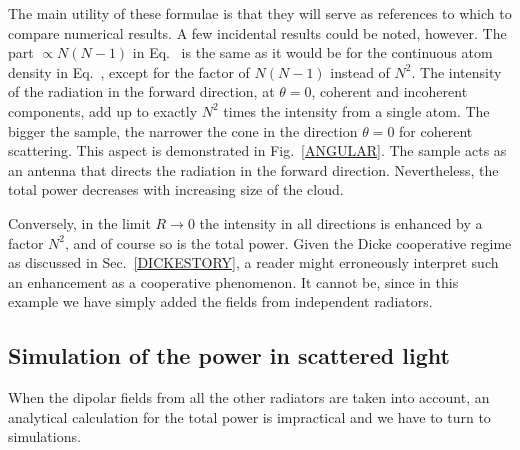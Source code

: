 The main utility of these formulae is that they will serve as references to which to compare numerical results. A few incidental results could be noted, however.  The part $\propto N(N-1)$ in Eq.~ is the same as it would be for the continuous atom density in Eq.~, except for the factor of $N(N-1)$ instead of $N^2$. The intensity of the radiation in the forward direction, at $\theta=0$, coherent and incoherent components, add up to exactly $N^2$ times the intensity from a single atom. The bigger the sample, the narrower the cone in the direction $\theta=0$ for coherent scattering.  This aspect is demonstrated in Fig.~\ref{ANGULAR}. The sample acts as an antenna that directs the radiation in the forward direction. Nevertheless, the total power decreases with increasing size of the cloud.

Conversely, in the limit $R\rightarrow0$ the intensity in all directions is enhanced by a factor $N^2$, and of course so is the total power. Given the Dicke cooperative regime as discussed in Sec.~\ref{DICKESTORY}, a reader might erroneously interpret such an enhancement as a cooperative phenomenon. It cannot be, since in this example we have simply added the fields from independent radiators.


\subsection{Simulation of the power in scattered light} 

When the dipolar fields from all the other radiators are taken into account, an analytical calculation for the total power is impractical and we have to turn to simulations. 

